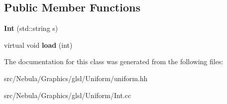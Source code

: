 \subsection*{\-Public \-Member \-Functions}
\begin{DoxyCompactItemize}
\item 
\hypertarget{classNeb_1_1glsl_1_1Uniform_1_1Scalar_1_1Int_afc2e77242ed6bbb588978085f515a7bf}{{\bfseries \-Int} (std\-::string s)}\label{classNeb_1_1glsl_1_1Uniform_1_1Scalar_1_1Int_afc2e77242ed6bbb588978085f515a7bf}

\item 
\hypertarget{classNeb_1_1glsl_1_1Uniform_1_1Scalar_1_1Int_a2d63b9bc35ba2d1773c9eb3429e00b3d}{virtual void {\bfseries load} (int)}\label{classNeb_1_1glsl_1_1Uniform_1_1Scalar_1_1Int_a2d63b9bc35ba2d1773c9eb3429e00b3d}

\end{DoxyCompactItemize}


\-The documentation for this class was generated from the following files\-:\begin{DoxyCompactItemize}
\item 
src/\-Nebula/\-Graphics/glsl/\-Uniform/uniform.\-hh\item 
src/\-Nebula/\-Graphics/glsl/\-Uniform/\-Int.\-cc\end{DoxyCompactItemize}
